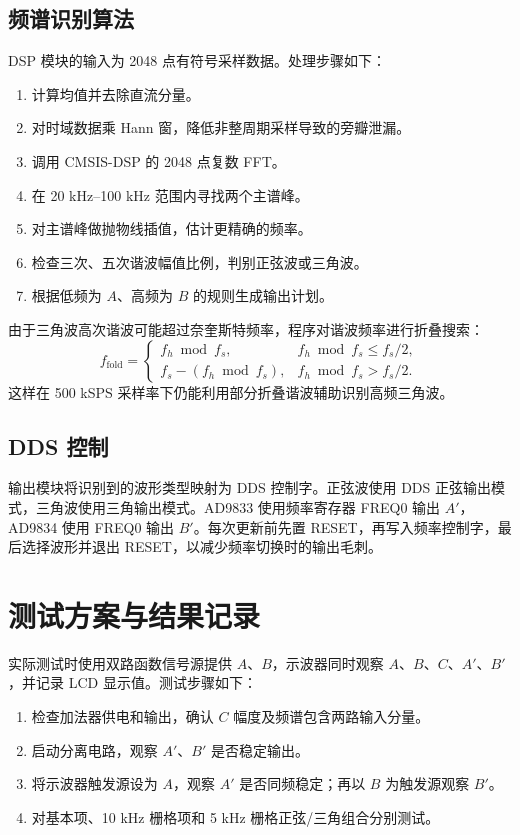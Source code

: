 \documentclass[UTF8,a4paper,zihao=-4]{ctexart}
\begin{document}
\subsection{频谱识别算法}

DSP 模块的输入为 2048 点有符号采样数据。处理步骤如下：
\begin{enumerate}
  \item 计算均值并去除直流分量。
  \item 对时域数据乘 Hann 窗，降低非整周期采样导致的旁瓣泄漏。
  \item 调用 CMSIS-DSP 的 2048 点复数 FFT。
  \item 在 20 kHz--100 kHz 范围内寻找两个主谱峰。
  \item 对主谱峰做抛物线插值，估计更精确的频率。
  \item 检查三次、五次谐波幅值比例，判别正弦波或三角波。
  \item 根据低频为 $A$、高频为 $B$ 的规则生成输出计划。
\end{enumerate}

由于三角波高次谐波可能超过奈奎斯特频率，程序对谐波频率进行折叠搜索：
\begin{equation}
  f_{\text{fold}} =
  \begin{cases}
    f_h \bmod f_s, & f_h \bmod f_s \leq f_s/2,\\
    f_s-(f_h \bmod f_s), & f_h \bmod f_s > f_s/2.
  \end{cases}
\end{equation}
这样在 500 kSPS 采样率下仍能利用部分折叠谐波辅助识别高频三角波。

\subsection{DDS 控制}

输出模块将识别到的波形类型映射为 DDS 控制字。正弦波使用 DDS 正弦输出模式，三角波使用三角输出模式。AD9833 使用频率寄存器 FREQ0 输出 $A'$，AD9834 使用 FREQ0 输出 $B'$。每次更新前先置 RESET，再写入频率控制字，最后选择波形并退出 RESET，以减少频率切换时的输出毛刺。

\section{测试方案与结果记录}

实际测试时使用双路函数信号源提供 $A$、$B$，示波器同时观察 $A$、$B$、$C$、$A'$、$B'$，并记录 LCD 显示值。测试步骤如下：
\begin{enumerate}
  \item 检查加法器供电和输出，确认 $C$ 幅度及频谱包含两路输入分量。
  \item 启动分离电路，观察 $A'$、$B'$ 是否稳定输出。
  \item 将示波器触发源设为 $A$，观察 $A'$ 是否同频稳定；再以 $B$ 为触发源观察 $B'$。
  \item 对基本项、10 kHz 栅格项和 5 kHz 栅格正弦/三角组合分别测试。
\end{enumerate}
\end{document}

